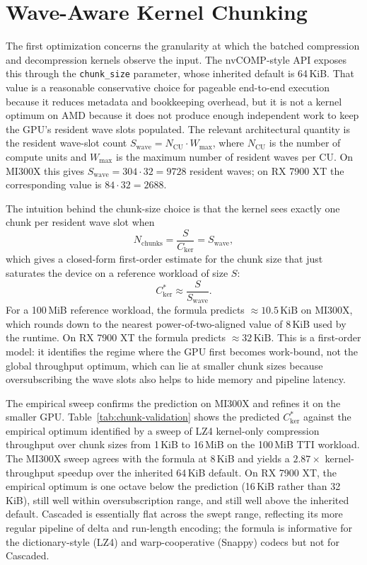 \section{Wave-Aware Kernel Chunking}
\label{sec:optim-chunk-size}

The first \arcto{} optimization concerns the granularity at which the
batched compression and decompression kernels observe the input. The
nvCOMP-style API exposes this through the \texttt{chunk\_size}
parameter, whose inherited default is 64\,KiB. That value is a
reasonable conservative choice for pageable end-to-end execution
because it reduces metadata and bookkeeping overhead, but it is not a
kernel optimum on AMD because it does not produce enough independent
work to keep the GPU's resident wave slots populated. The relevant
architectural quantity is the resident wave-slot count
$S_{\text{wave}} = N_{\text{CU}} \cdot W_{\text{max}}$, where
$N_{\text{CU}}$ is the number of compute units and $W_{\text{max}}$
is the maximum number of resident waves per CU. On MI300X this gives
$S_{\text{wave}} = 304 \cdot 32 = 9728$ resident waves; on RX 7900 XT
the corresponding value is $84 \cdot 32 = 2688$.

The intuition behind the chunk-size choice is that the kernel sees
exactly one chunk per resident wave slot when
\[
N_{\text{chunks}} = \frac{S}{C_{\text{ker}}} = S_{\text{wave}},
\]
which gives a closed-form first-order estimate for the chunk size
that just saturates the device on a reference workload of size $S$:
\[
C_{\text{ker}}^{*} \approx \frac{S}{S_{\text{wave}}}.
\]
For a 100\,MiB reference workload, the formula predicts
$\approx 10.5\,\text{KiB}$ on MI300X, which rounds down to the nearest
power-of-two-aligned value of 8\,KiB used by the runtime. On RX 7900
XT the formula predicts $\approx 32\,\text{KiB}$. This is a
first-order model: it identifies the regime where the GPU first
becomes work-bound, not the global throughput optimum, which can lie
at smaller chunk sizes because oversubscribing the wave slots also
helps to hide memory and pipeline latency.

The empirical sweep confirms the prediction on MI300X and refines it
on the smaller GPU. Table~\ref{tab:chunk-validation} shows the
predicted $C_{\text{ker}}^{*}$ against the empirical optimum
identified by a sweep of LZ4 kernel-only compression throughput over
chunk sizes from 1\,KiB to 16\,MiB on the 100\,MiB TTI workload. The
MI300X sweep agrees with the formula at 8\,KiB and yields a
$2.87\times$ kernel-throughput speedup over the inherited 64\,KiB
default. On RX 7900 XT, the empirical optimum is one octave below the
prediction (16\,KiB rather than 32\,KiB), still well within
oversubscription range, and still well above the inherited default.
Cascaded is essentially flat across the swept range, reflecting its
more regular pipeline of delta and run-length encoding; the
formula is informative for the dictionary-style (LZ4) and
warp-cooperative (Snappy) codecs but not for Cascaded.

